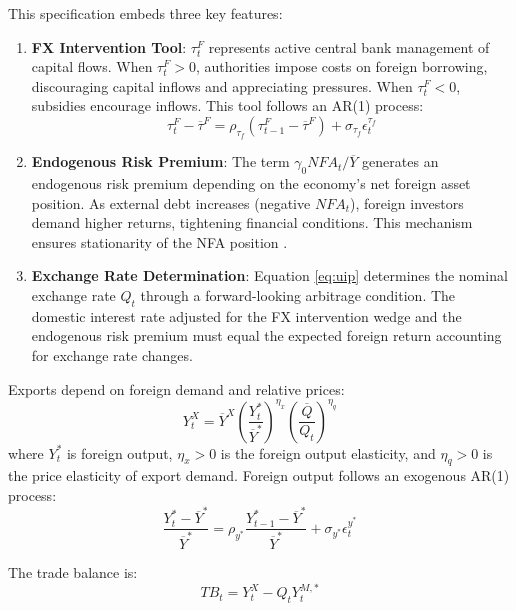 \documentclass[12pt]{article}
\begin{document}
This specification embeds three key features:
\begin{enumerate}[label=(\roman*)]
\item \textbf{FX Intervention Tool}: $\tau_t^F$ represents active central bank management of capital flows. When $\tau_t^F > 0$, authorities impose costs on foreign borrowing, discouraging capital inflows and appreciating pressures. When $\tau_t^F < 0$, subsidies encourage inflows. This tool follows an AR(1) process:
\begin{equation}
\tau_t^F - \overline{\tau}^F = \rho_{\tau_f} (\tau_{t-1}^F - \overline{\tau}^F) + \sigma_{\tau_f} \epsilon_t^{\tau_f}
\end{equation}

\item \textbf{Endogenous Risk Premium}: The term $\gamma_0 NFA_t / \overline{Y}$ generates an endogenous risk premium depending on the economy's net foreign asset position. As external debt increases (negative $NFA_t$), foreign investors demand higher returns, tightening financial conditions. This mechanism ensures stationarity of the NFA position \citep{schmitt2003closing}.

\item \textbf{Exchange Rate Determination}: Equation \eqref{eq:uip} determines the nominal exchange rate $Q_t$ through a forward-looking arbitrage condition. The domestic interest rate adjusted for the FX intervention wedge and the endogenous risk premium must equal the expected foreign return accounting for exchange rate changes.
\end{enumerate}

Exports depend on foreign demand and relative prices:
\begin{equation}
Y_t^X = \overline{Y}^X \left( \frac{Y_t^*}{\overline{Y}^*} \right)^{\eta_x} \left( \frac{\overline{Q}}{Q_t} \right)^{\eta_q}
\end{equation}
where $Y_t^*$ is foreign output, $\eta_x > 0$ is the foreign output elasticity, and $\eta_q > 0$ is the price elasticity of export demand. Foreign output follows an exogenous AR(1) process:
\begin{equation}
\frac{Y_t^* - \overline{Y}^*}{\overline{Y}^*} = \rho_{y^*} \frac{Y_{t-1}^* - \overline{Y}^*}{\overline{Y}^*} + \sigma_{y^*} \epsilon_t^{y^*}
\end{equation}

The trade balance is:
\begin{equation}
TB_t = Y_t^X - Q_t Y_t^{M,*}
\end{equation}
\end{document}
